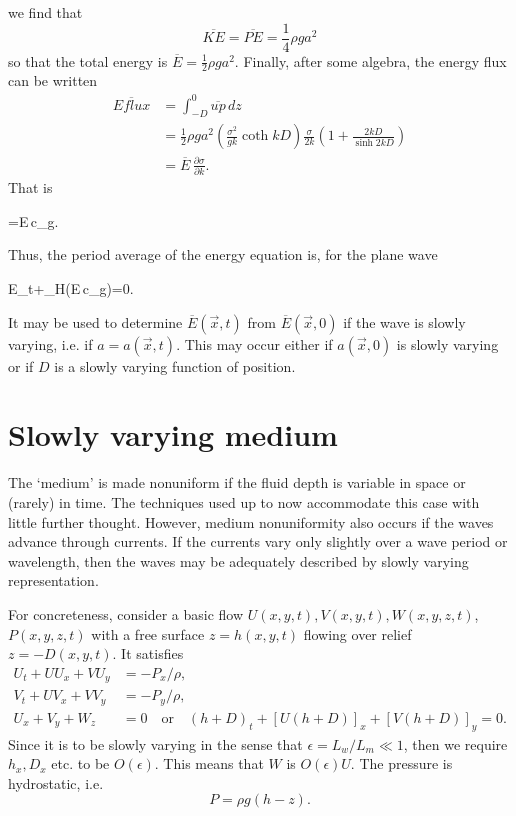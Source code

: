 \sourcepagebreak

we find that
\[
	\overline{KE}=\overline{PE}=\frac14\rho ga^2
\]
so that the total energy is $\overline E=\frac12\rho ga^2$. Finally, after some algebra, the energy flux can
be written
\begin{align*}
	\overline{Eflux}
	 & =\int_{-D}^{0}\overline{up}\,dz                  \\
	 & =\frac12\rho ga^2
	\left(\frac{\sigma^2}{gk}\coth kD\right)
	\frac{\sigma}{2k}
	\left(1+\frac{2kD}{\sinh2kD}\right)                 \\
	 & =\overline E\,\frac{\partial\sigma}{\partial k}.
\end{align*}
That is
\begin{waveequation}
	=\overline E\,\vec c_g.
\end{waveequation}
Thus, the period average of the energy equation is, for the plane wave
\begin{waveequation}
	\overline E_t+\nabla_H\cdot(\overline E\,\vec c_g)=0.
\end{waveequation}
It may be used to determine $\overline E(\vec x,t)$ from $\overline E(\vec x,0)$ if the wave is slowly varying, i.e. if
$a=a(\vec x,t)$. This may occur either if $a(\vec x,0)$ is slowly varying or if $D$ is a slowly varying
function of position.

\section{Slowly varying medium}

The `medium' is made nonuniform if the fluid depth is variable in space or (rarely) in
time. The techniques used up to now accommodate this case with little further thought.
However, medium nonuniformity also occurs if the waves advance through currents. If
the currents vary only slightly over a wave period or wavelength, then the waves may be
adequately described by slowly varying representation.

\sourcepagebreak

For concreteness, consider a basic flow $U(x,y,t),V(x,y,t),W(x,y,z,t)$,
$P(x,y,z,t)$ with a free surface $z=h(x,y,t)$ flowing over relief $z=-D(x,y,t)$. It
satisfies
\begin{align*}
	U_t+UU_x+VU_y & =-P_x/\rho, \\
	V_t+UV_x+VV_y & =-P_y/\rho, \\
	U_x+V_y+W_z   & =0
	\quad\text{or}\quad
	(h+D)_t+[U(h+D)]_x+[V(h+D)]_y=0.
\end{align*}
Since it is to be slowly varying in the sense that $\epsilon=L_w/L_m\ll1$, then we require
$h_x,D_x$ etc. to be $O(\epsilon)$. This means that $W$ is $O(\epsilon)U$. The pressure is hydrostatic, i.e.
\[
	P=\rho g(h-z).
\]

